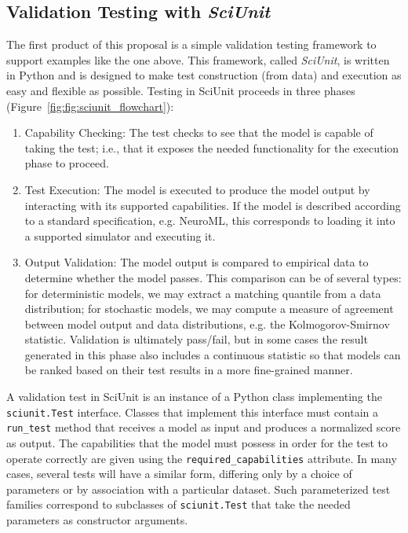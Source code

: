 \documentclass[11pt,letterpaper]{article}
\begin{document}
\subsection{Validation Testing with \emph{SciUnit}} 
The first product of this proposal is a simple validation testing framework to support examples like the one above. This framework, called \emph{SciUnit}, is written in Python and is designed to make test construction (from data) and execution as easy and flexible as possible. Testing in SciUnit proceeds in three phases (Figure~\ref{fig:fig:sciunit_flowchart}):
\begin{enumerate}
\item Capability Checking: The test checks to see that the model is capable of taking the test; i.e., that it exposes the needed functionality for the execution phase to proceed.
\item Test Execution: The model is executed to produce the model output by interacting with its supported capabilities.  If the model is described according to a standard specification, e.g. NeuroML, this corresponds to loading it into a supported simulator and executing it. 
\item Output Validation: The model output is compared to empirical data to determine whether the model passes.  This comparison can be of several types: for deterministic models, we may extract a matching quantile from a data distribution; for stochastic models, we may compute a measure of agreement between model output and data distributions, e.g. the Kolmogorov-Smirnov statistic.  Validation is ultimately pass/fail, but in some cases the result generated in this phase also includes a continuous statistic so that models can be ranked based on their test results in a more fine-grained manner.   
\end{enumerate}

A validation test in SciUnit is an instance of a Python class implementing the \verb|sciunit.Test| interface. Classes that implement this interface must contain a \verb|run_test| method that receives a model as input and produces a normalized score as output. The capabilities that the model must possess in order for the test to operate correctly are given using the \verb|required_capabilities| attribute. In many cases, several tests will have a similar form, differing only by a choice of parameters or by association with a particular dataset. Such parameterized test families correspond to subclasses of \verb|sciunit.Test| that take the needed parameters as constructor arguments. 
\end{document}
